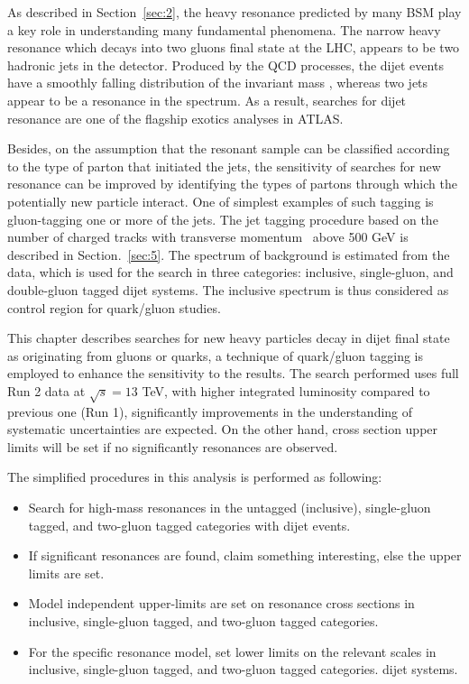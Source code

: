 As described in Section~\ref{sec:2}, the heavy resonance predicted by many BSM play a key role in understanding many fundamental phenomena. The narrow heavy resonance which decays into two gluons final state at the LHC, appears to be two hadronic jets in the detector. Produced by the QCD processes, the dijet events have a smoothly falling distribution of the invariant mass \mjj, whereas two jets appear to be a resonance in the \mjj spectrum. As a result, searches for dijet resonance are one of the flagship exotics analyses in ATLAS.


Besides, on the assumption that the resonant sample can be classified according to the type of parton that initiated the jets, the sensitivity of searches for new resonance can be improved by identifying the types of partons through which the potentially new particle interact.  One of simplest examples of such tagging is gluon-tagging one or more of the jets. The jet tagging procedure based on the number of
charged tracks with transverse momentum \pt~above 500 GeV is described in Section.~\ref{sec:5}. The \mjj spectrum of background is estimated from the data, which is used for the search in three categories: inclusive, single-gluon, and double-gluon tagged dijet systems. The inclusive \mjj spectrum is thus considered as control region for quark/gluon studies.



This chapter describes searches for new heavy particles decay in dijet final state as originating from gluons or quarks, a technique of quark/gluon tagging is employed to enhance the sensitivity to the results. The search performed uses full Run 2 data at $\sqrt{s} = 13$ TeV, with higher integrated luminosity compared to previous one (Run 1), significantly improvements in the understanding of systematic uncertainties are expected. On the other hand,  cross section upper limits will be set if no significantly resonances are observed.

The simplified procedures in this analysis is performed as following: 
\begin{itemize}
	\item Search for high-mass resonances in the untagged (inclusive), single-gluon tagged,
	and two-gluon tagged categories with dijet events.
	\item If significant resonances are found, claim something interesting, else the upper limits are set. 
	\item Model independent upper-limits are set on resonance cross sections in
	inclusive, single-gluon tagged, and two-gluon tagged categories.
	\item For the specific resonance model, set lower limits on the relevant scales in inclusive, single-gluon tagged, and two-gluon tagged categories.
	dijet systems.
\end{itemize}

